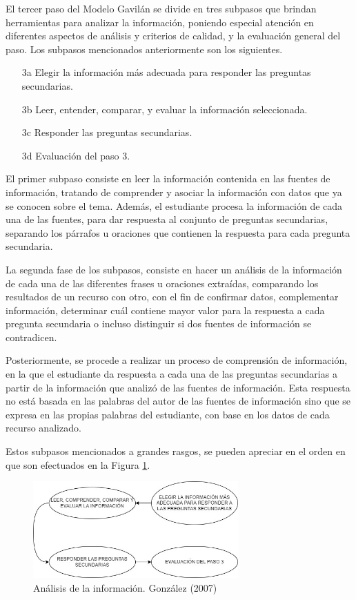 El tercer paso del Modelo Gavilán se divide en tres subpasos que brindan herramientas para analizar la información, poniendo especial atención en diferentes aspectos de análisis y criterios de calidad, y la evaluación general del paso. Los subpasos mencionados anteriormente son los siguientes.

\begin{itemize}
  \item [3a] Elegir la información más adecuada para responder las preguntas secundarias.
  \item [3b] Leer, entender, comparar, y evaluar la información seleccionada.
  \item [3c] Responder las preguntas secundarias.
  \item [3d] Evaluación del paso 3.
\end{itemize}

El primer subpaso consiste en leer la información contenida en las fuentes de información, tratando de comprender y asociar la información con datos que ya se conocen sobre el tema. Además, el estudiante procesa la información de cada una de las fuentes, para dar respuesta al conjunto de preguntas secundarias, separando los párrafos u oraciones que contienen la respuesta para cada pregunta secundaria.

La segunda fase de los subpasos, consiste en hacer un análisis de la información de cada una de las diferentes frases u oraciones extraídas, comparando los resultados de un recurso con otro, con el fin de confirmar datos, complementar información, determinar cuál contiene mayor valor para la respuesta a cada pregunta secundaria o incluso distinguir si dos fuentes de información se contradicen.

Posteriormente, se procede a realizar un proceso de comprensión de información, en la que el estudiante da respuesta a cada una de las preguntas secundarias a partir de la información que analizó de las fuentes de información. Esta respuesta no está basada en las palabras del autor de las fuentes de información sino que se expresa en las propias palabras del estudiante, con base en los datos de cada recurso analizado.

Estos subpasos mencionados a grandes rasgos, se pueden apreciar en el orden en que son efectuados en la Figura \ref{fig:25}.

\begin{figure}[H]
  \centering
  \includegraphics[width=0.70\textwidth]{Cap2/Figuras/Análisis de la información.jpg}
  \caption{Análisis de la información. González (2007)}
  \label{fig:25}
\end{figure}

